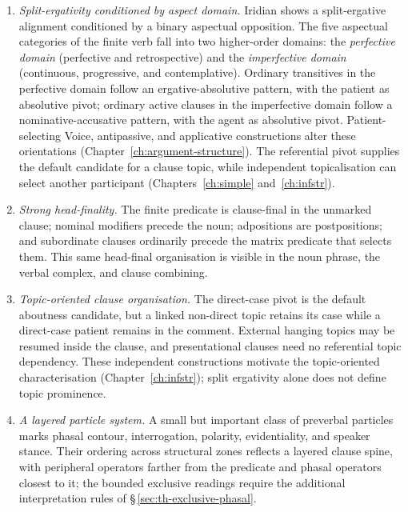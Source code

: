 \begin{enumerate}[wide]
	\item \textit{Split-ergativity conditioned by aspect domain.} Iridian shows
	a split-ergative alignment conditioned by a binary aspectual opposition.
	The five aspectual categories of the finite verb fall into two higher-order
	domains: the \textit{perfective domain} (perfective and retrospective) and
	the \textit{imperfective domain} (continuous, progressive, and
	contemplative). Ordinary transitives in the perfective domain follow an
	ergative-absolutive pattern, with the patient as absolutive pivot; ordinary active
	clauses in the imperfective domain follow a nominative-accusative pattern,
	with the agent as absolutive pivot. Patient-selecting Voice, antipassive,
	and applicative constructions alter these orientations
	(Chapter~\ref{ch:argument-structure}). The referential pivot supplies
	the default candidate for a clause topic, while independent topicalisation
	can select another participant (Chapters~\ref{ch:simple} and~\ref{ch:infstr}).

	\item \textit{Strong head-finality.} The finite predicate is clause-final in
	the unmarked clause; nominal modifiers precede the noun; adpositions are
	postpositions; and subordinate clauses ordinarily precede the matrix predicate
	that selects them. This same head-final organisation is visible in the noun
	phrase, the verbal complex, and clause combining.

\item \textit{Topic-oriented clause organisation.} The direct-case pivot is
 the default aboutness candidate, but a linked non-direct topic retains its
 case while a direct-case patient remains in the comment. External hanging
 topics may be resumed inside the clause, and presentational clauses need no
 referential topic dependency. These independent constructions motivate the
 topic-oriented characterisation (Chapter~\ref{ch:infstr}); split ergativity
 alone does not define topic prominence.

	\item \textit{A layered particle system.} A small but important class of
	preverbal particles marks phasal contour, interrogation, polarity,
	evidentiality, and speaker stance. Their ordering across structural zones
	reflects a layered clause spine, with peripheral operators farther from
	the predicate and phasal operators closest to it; the bounded exclusive
	readings require the additional interpretation rules of
	§\,\ref{sec:th-exclusive-phasal}.


\end{enumerate}

